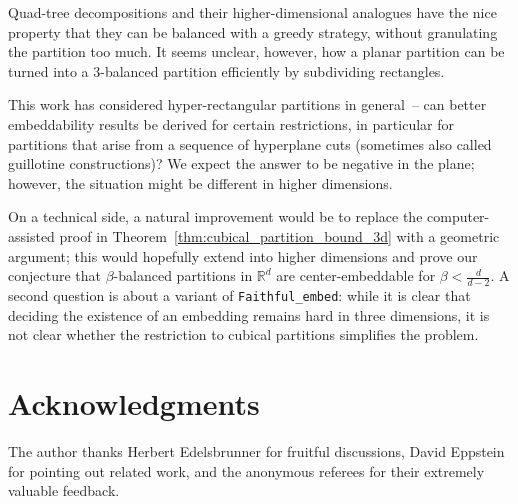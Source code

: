 \documentclass[12pt]{article}
\newcommand{\R}{\mathbb{R}}
\begin{document}
Quad-tree decompositions and their higher-dimensional analogues have
the nice property that they can be balanced with a greedy strategy,
without granulating the partition too much. 
It seems unclear, however, how a planar partition can be
turned into a $3$-balanced partition efficiently by subdividing
rectangles.

This work has considered
hyper-rectangular partitions in general~-- can better embeddability
results be derived for certain restrictions,
in particular for partitions that arise from a sequence of 
hyperplane cuts (sometimes also called guillotine constructions)?
We expect the answer to be negative in the plane; however, the
situation might be different in higher dimensions.

On a technical side, a natural improvement would be to replace
the computer-assisted proof in Theorem~\ref{thm:cubical_partition_bound_3d}
with a geometric argument; this would hopefully extend into higher dimensions
and prove our conjecture that $\beta$-balanced partitions in $\R^d$
are center-embeddable for $\beta<\frac{d}{d-2}$.
A second question is about a variant of \texttt{Faithful\_embed}: 
while it is clear
that deciding the existence of an embedding remains hard in three
dimensions, it is not clear whether the restriction to cubical
partitions simplifies the problem.

\section*{Acknowledgments}
The author thanks Herbert Edelsbrunner for fruitful discussions,
David Eppstein for pointing out related work,
and the anonymous referees for their extremely valuable feedback.
\end{document}
